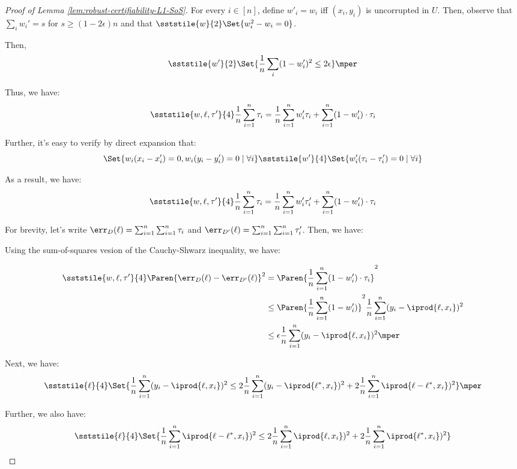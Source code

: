 \begin{proof}[Proof of Lemma \ref{lem:robust-certifiability-L1-SoS}]

For every $i \in [n]$, define $w'_i = w_i$ iff $(x_i,y_i)$ is uncorrupted in $U$.
Then, observe that $\sum_i w_i' = s$ for $s \geq (1-2\epsilon)n$ and that $\sststile{w}{2} \Set{w_i^2 - w_i = 0}$. 

Then, 
\[
\sststile{w'}{2} \Set{ \frac{1}{n} \sum_i (1-w'_i)^2 \leq 2 \epsilon}\mper
\]

Thus, we have:%
\[
\sststile{w,\ell, \tau'}{4} \frac{1}{n} \sum_{i = 1}^n \tau_i = \frac{1}{n} \sum_{i = 1}^n w'_i \tau_i + \sum_{i = 1}^n (1-w'_i) \cdot \tau_i
\]

Further, it's easy to verify by direct expansion that:
\[
\Set{w_i(x_i -x_i') = 0, w_i (y_i - y_i') = 0 \mid \forall i} \sststile{w'}{4} \Set{ w'_i (\tau_i -\tau'_i) = 0 \mid \forall i}
\]

As a result, we have:
\[
\sststile{w,\ell, \tau'}{4} \frac{1}{n} \sum_{i = 1}^n \tau_i = \frac{1}{n} \sum_{i = 1}^n w'_i \tau_i' + \sum_{i = 1}^n (1-w'_i) \cdot \tau_i
\]

For brevity, let's write $\err_{D}(\ell) = \sum_{i =1}^n \sum_{i = 1}^n \tau_i$ and $\err_{D'} (\ell) = \sum_{i =1}^n \sum_{i = 1}^n \tau_i'$. Then, we have:


Using the sum-of-squares vesion of the Cauchy-Shwarz inequality, we have:

\begin{align}
\sststile{w,\ell, \tau'}{4} \Paren{\err_D(\ell) - \err_{D'}(\ell)}^{2} &= \Paren{\frac{1}{n} \sum_{i = 1}^n (1-w'_i) \cdot \tau_i}^2\notag\\
&\leq \Paren{\frac{1}{n} \sum_{i = 1}^n (1-w'_i)}^2 \frac{1}{n} \sum_{i =1}^n (y_i - \iprod{\ell,x_i})^2 \notag\\
&\leq \epsilon \frac{1}{n} \sum_{i =1}^n (y_i - \iprod{\ell,x_i})^2  \label{eq:CS-bound-L1} \mper
\end{align}

Next, we have:
\[
\sststile{\ell}{4} \Set{ \frac{1}{n} \sum_{i =1}^n (y_i - \iprod{\ell,x_i})^2 \leq 2\frac{1}{n} \sum_{i =1}^n (y_i - \iprod{\ell^{*},x_i})^2 + 2\frac{1}{n} \sum_{i =1}^n \iprod{\ell-\ell^{*},x_i})^2} \mper
\]

Further, we also have:
\[
\sststile{\ell}{4} \Set{ \frac{1}{n} \sum_{i =1}^n \iprod{\ell-\ell^{*},x_i})^2 \leq 2\frac{1}{n} \sum_{i =1}^n \iprod{\ell,x_i})^2 + 2 \frac{1}{n} \sum_{i =1}^n \iprod{\ell^{*},x_i})^2 }
\]


\end{proof}
